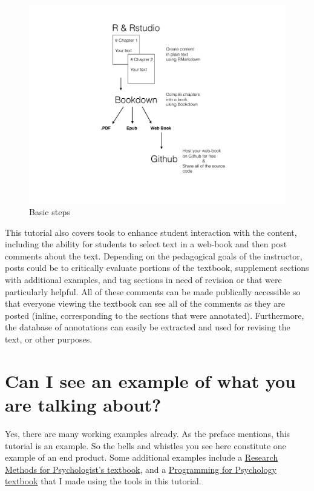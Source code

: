 \documentclass[]{book}
\theoremstyle{definition}
\theoremstyle{definition}
\theoremstyle{definition}
\theoremstyle{remark}
\begin{document}
\begin{figure}[htbp]
\centering
\includegraphics{Figures/OERTutorial_Overview.pdf}
\caption{\label{fig:fig1}Basic steps}
\end{figure}

This tutorial also covers tools to enhance student interaction with the
content, including the ability for students to select text in a web-book
and then post comments about the text. Depending on the pedagogical
goals of the instructor, posts could be to critically evaluate portions
of the textbook, supplement sections with additional examples, and tag
sections in need of revision or that were particularly helpful. All of
these comments can be made publically accessible so that everyone
viewing the textbook can see all of the comments as they are posted
(inline, corresponding to the sections that were annotated).
Furthermore, the database of annotations can easily be extracted and
used for revising the text, or other purposes.

\section{Can I see an example of what you are talking
about?}\label{can-i-see-an-example-of-what-you-are-talking-about}

Yes, there are many working examples already. As the preface mentions,
this tutorial is an example. So the bells and whistles you see here
constitute one example of an end product. Some additional examples
include a \href{https://crumplab.github.io/ResearchMethods/}{Research
Methods for Psychologist's textbook}, and a
\href{https://crumplab.github.io/programmingforpsych/}{Programming for
Psychology textbook} that I made using the tools in this tutorial.
\end{document}
